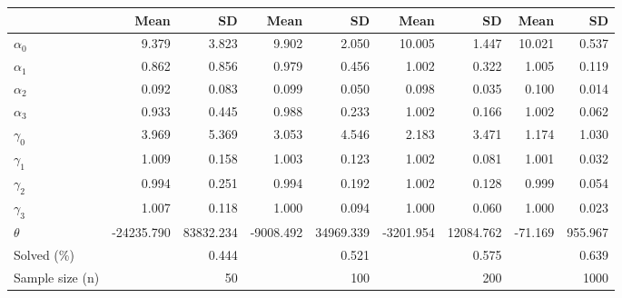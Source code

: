 
\begin{tabular}[t]{lrrrrrrrr}
\toprule
  & Mean & SD & Mean  & SD  & Mean   & SD   & Mean    & SD   \\
\midrule
$\alpha_{0}$ & 9.379 & 3.823 & 9.902 & 2.050 & 10.005 & 1.447 & 10.021 & 0.537\\
$\alpha_{1}$ & 0.862 & 0.856 & 0.979 & 0.456 & 1.002 & 0.322 & 1.005 & 0.119\\
$\alpha_{2}$ & 0.092 & 0.083 & 0.099 & 0.050 & 0.098 & 0.035 & 0.100 & 0.014\\
$\alpha_{3}$ & 0.933 & 0.445 & 0.988 & 0.233 & 1.002 & 0.166 & 1.002 & 0.062\\
$\gamma_{0}$ & 3.969 & 5.369 & 3.053 & 4.546 & 2.183 & 3.471 & 1.174 & 1.030\\
$\gamma_{1}$ & 1.009 & 0.158 & 1.003 & 0.123 & 1.002 & 0.081 & 1.001 & 0.032\\
$\gamma_{2}$ & 0.994 & 0.251 & 0.994 & 0.192 & 1.002 & 0.128 & 0.999 & 0.054\\
$\gamma_{3}$ & 1.007 & 0.118 & 1.000 & 0.094 & 1.000 & 0.060 & 1.000 & 0.023\\
$\theta$ & -24235.790 & 83832.234 & -9008.492 & 34969.339 & -3201.954 & 12084.762 & -71.169 & 955.967\\
Solved (\%) &  & 0.444 &  & 0.521 &  & 0.575 &  & 0.639\\
Sample size (n) &  & 50 &  & 100 &  & 200 &  & 1000\\
\bottomrule
\end{tabular}
